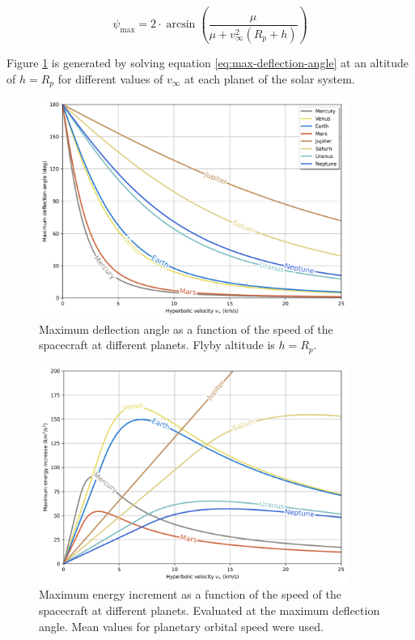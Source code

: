 \begin{equation}
  \psi_{\max} = 2 \cdot \arcsin{\left(\frac{\mu}{\mu + {v}^{2}_{\infty}(R_p + h)}\right)}
  \label{eq:max-deflection-angle}
\end{equation}

Figure \ref{fig:deflection-angle-at-speed} is generated by solving equation
\ref{eq:max-deflection-angle} at an altitude of $h = R_p$ for different values
of $v_{\infty}$ at each planet of the solar system.

\begin{figure}[H]
  \centering
  \includegraphics[width=0.9\textwidth]{fig/static/deflection_angle.png}
  \caption[Maximum deflection angle as a function of the speed of the spacecraft
    at different planets.]{Maximum deflection angle as a function of the
    speed of the spacecraft at different planets. Flyby altitude is
    $h = R_p$.}
  \label{fig:deflection-angle-at-speed}
\end{figure}

\begin{figure}[H]
  \centering
  \includegraphics[width=0.9\textwidth]{fig/static/max_energy.png}
  \caption[Maximum energy increment as a function of the speed of the
    spacecraft at different planets.]{Maximum energy increment as a function
    of the speed of the spacecraft at different planets. Evaluated at the
    maximum deflection angle. Mean values for planetary orbital speed were used.}
  \label{fig:max-energy-at-speed}
\end{figure}

